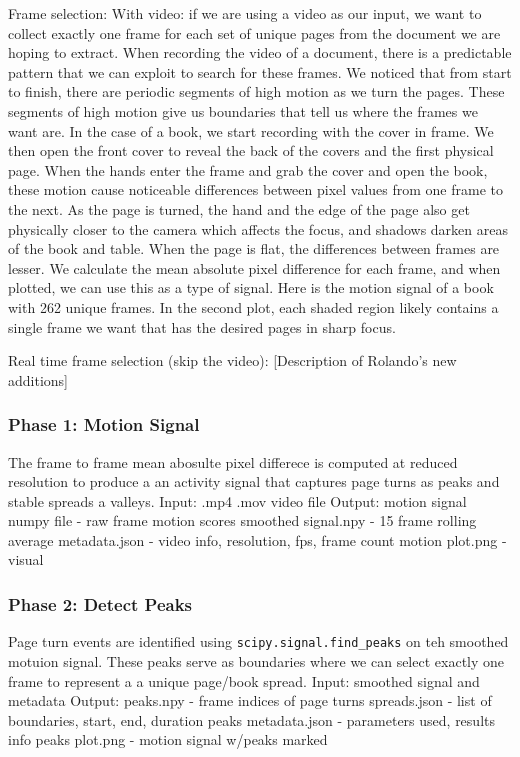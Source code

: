Frame selection:
With video: if we are using a video as our input, we want to collect exactly one frame for each set of unique pages from the document we are hoping to extract. When recording the video of a document, there is a predictable pattern that we can exploit to search for these frames. We noticed that from start to finish, there are periodic segments of high motion as we turn the pages. These segments of high motion give us boundaries that tell us where the frames we want are. In the case of a book, we start recording with the cover in frame. We then open the front cover to reveal the back of the covers and the first physical page. When the hands enter the frame and grab the cover and open the book, these motion cause  noticeable differences between pixel values from one frame to the next. As the page is turned, the hand and the edge of the page also get physically closer to the camera which affects the focus, and shadows darken areas of the book and table. When the page is flat, the differences between frames are lesser. We calculate the mean absolute pixel difference for each frame, and when plotted, we can use this as a type of signal. Here is the motion signal of a book with 262 unique frames. In the second plot, each shaded region likely contains a single frame we want that has the desired pages in sharp focus.

Real time frame selection (skip the video): [Description of Rolando's new additions]

\subsubsection{Phase 1: Motion Signal}
The frame to frame mean abosulte pixel differece is computed at reduced resolution to produce a an activity signal that captures page turns as peaks and stable spreads a valleys.
Input: .mp4 .mov video file
Output:
    motion signal numpy file - raw frame motion scores
    smoothed signal.npy - 15 frame rolling average
    metadata.json - video info, resolution, fps, frame count
    motion plot.png - visual

\subsubsection{Phase 2: Detect Peaks}
Page turn events are identified using \texttt{scipy.signal.find\_peaks} on teh smoothed motuion signal. These peaks serve as boundaries where we can select exactly one frame to represent a a unique page/book spread.
Input: smoothed signal and metadata
Output:
    peaks.npy - frame indices of page turns
    spreads.json - list of boundaries, start, end, duration
    peaks metadata.json - parameters used, results info
    peaks plot.png - motion signal w/peaks marked


